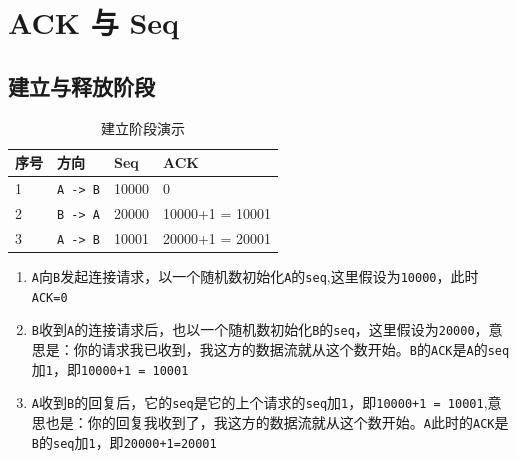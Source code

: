 \documentclass[UTF8,a4paper,8pt]{ctexbook}
\begin{document}
		
	\section{ACK 与 Seq}
		\subsection{建立与释放阶段}
			\begin{table}[htbp]
				\centering
				\caption{建立阶段演示}
				\begin{tabular}{m{1cm}|m{3cm}|m{4cm}|m{4cm}}
					\toprule
						序号 & 方向 & Seq & ACK \\
					\midrule
						 1& \verb|A -> B|& 10000 & 0 \\
						 2& \verb|B -> A|& 20000 & 10000+1 = 10001 \\
					 	 3& \verb|A -> B|& 10001 & 20000+1 = 20001 \\
					\bottomrule
				\end{tabular}
			\end{table}
			\begin{enumerate}
				\item \verb|A|向\verb|B|发起连接请求，以一个随机数初始化\verb|A|的\verb|seq|,这里假设为\verb|10000|，此时\verb|ACK=0|
				\item \verb|B|收到\verb|A|的连接请求后，也以一个随机数初始化\verb|B|的\verb|seq|，这里假设为\verb|20000|，意思是：你的请求我已收到，我这方的数据流就从这个数开始。\verb|B|的\verb|ACK|是\verb|A|的\verb|seq|加\verb|1|，即\verb|10000+1 = 10001|
				\item \verb|A|收到\verb|B|的回复后，它的\verb|seq|是它的上个请求的\verb|seq|加\verb|1|，即\verb|10000+1 = 10001|,意思也是：你的回复我收到了，我这方的数据流就从这个数开始。\verb|A|此时的\verb|ACK|是\verb|B|的\verb|seq|加\verb|1|，即\verb|20000+1=20001|
			\end{enumerate}
		
\end{document}
